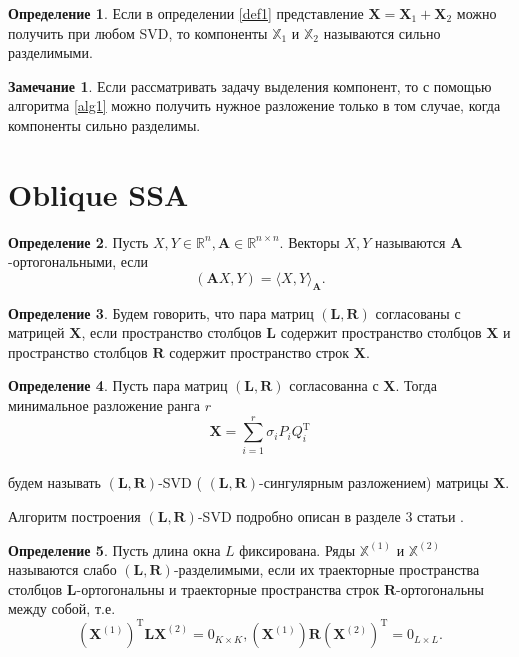\documentclass[specialist, substylefile = spbureport.rtx, subf,href,colorlinks=true, 12pt]{disser}
\theoremstyle{definition}
\newtheorem{definition}{Определение}
\newtheorem{remark}{Замечание}
\begin{document}
\begin{definition}
    Если в определении \ref{def1} представление $\mathbf{X} = \mathbf{X}_1 + \mathbf{X}_2$ можно получить при любом SVD, то компоненты $\mathbb{X}_1$ и $\mathbb{X}_2$ называются сильно разделимыми.
\end{definition}

\begin{remark}
    Если рассматривать задачу выделения компонент, то с помощью алгоритма \ref{alg1} можно получить нужное разложение только в том случае, когда компоненты сильно разделимы.
\end{remark}

\section{Oblique SSA}

\begin{definition}
    Пусть $X, Y \in \mathbb{R}^n, \mathbf{A} \in \mathbb{R}^{n \times n}$. Векторы $X, Y$ называются $\mathbf{A}$-ортогональными, если
    \begin{equation*}
        (\mathbf{A}X, Y) =  \langle X, Y\rangle _{\mathbf{A}}.
    \end{equation*}
\end{definition}
\begin{definition}
    Будем говорить, что пара матриц $(\mathbf{L}, \mathbf{R})$ согласованы с матрицей $\mathbf{X}$, если пространство столбцов $\mathbf{L}$ содержит пространство столбцов $\mathbf{X}$ и пространство столбцов $\mathbf{R}$ содержит пространство строк $\mathbf{X}$.
\end{definition}
\begin{definition}
    Пусть пара матриц $(\mathbf{L}, \mathbf{R})$ согласованна с $\mathbf{X}$. Тогда минимальное разложение ранга $r$
    \begin{equation*}
        \mathbf{X} = \sum_{i = 1}^{r}\sigma_iP_iQ_i^{\mathrm{T}}
    \end{equation*}\\
    будем называть $(\mathbf{L}, \mathbf{R})$-SVD ( $(\mathbf{L}, \mathbf{R})$-сингулярным разложением) матрицы $\mathbf{X}$.
\end{definition}

Алгоритм построения $(\mathbf{L}, \mathbf{R})$-SVD подробно описан в разделе 3 статьи \cite{Golyandina15}.

\begin{definition}
    Пусть длина окна $L$ фиксирована. Ряды $\mathbb{X}^{(1)}$ и $\mathbb{X}^{(2)}$ называются слабо $(\mathbf{L}, \mathbf{R})$-разделимыми, если их траекторные пространства столбцов $\mathbf{L}$-ортогональны и траекторные пространства строк $\mathbf{R}$-ортогональны между собой, т.е.
    \begin{equation*}
        (\mathbf{X}^{(1)})^{\mathrm{T}}\mathbf{LX}^{(2)} = 0_{K \times K}, (\mathbf{X}^{(1)})\mathbf{R}(\mathbf{X}^{(2)})^{\mathrm{T}} = 0_{L \times L}.
    \end{equation*}

\end{definition}
\end{document}
